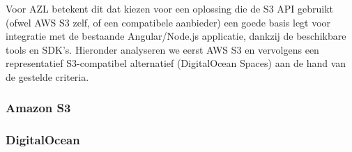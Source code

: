 Voor AZL betekent dit dat kiezen voor een oplossing die de S3 API gebruikt (ofwel AWS S3 zelf, of een compatibele aanbieder) een goede basis legt voor integratie met de bestaande Angular/Node.js applicatie, dankzij de beschikbare tools en SDK's. Hieronder analyseren we eerst AWS S3 en vervolgens een representatief S3-compatibel alternatief (DigitalOcean Spaces) aan de hand van de gestelde criteria.

\subsubsection{Amazon S3}
\subsubsection{DigitalOcean}




